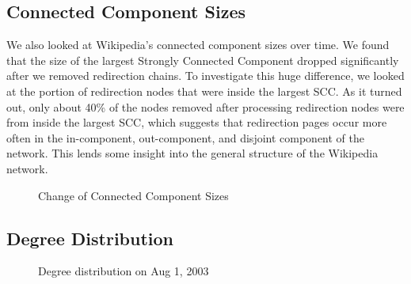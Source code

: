 \documentclass[10pt,twocolumn]{article}
\begin{document}
\subsection{Connected Component Sizes}
We also looked at Wikipedia's connected component sizes over time. We found that the size of the largest Strongly Connected Component dropped significantly after we removed redirection chains. To investigate this huge difference, we looked at the portion of redirection nodes that were inside the largest SCC. As it turned out, only about 40\% of the nodes removed after processing redirection nodes were from inside the largest SCC, which suggests that redirection pages occur more often in the in-component, out-component, and disjoint component of the network. This lends some insight into the general structure of the Wikipedia network.

\begin{figure}[ht]
\caption{Change of Connected Component Sizes \label{fig:cc}}
\end{figure}

\subsection{Degree Distribution}

\begin{figure}[ht]
\caption{Degree distribution on Aug 1, 2003}
\label{fig:deg_dist}
\end{figure}
\end{document}
